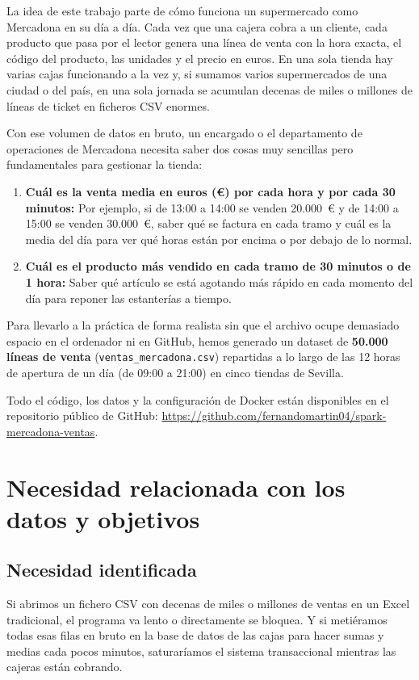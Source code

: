 \documentclass[a4paper,12pt]{article}
\newcommand{\RepoURL}{https://github.com/fernandomartin04/spark-mercadona-ventas}
\begin{document}
La idea de este trabajo parte de cómo funciona un supermercado como Mercadona en su día a día. Cada vez que una cajera cobra a un cliente, cada producto que pasa por el lector genera una línea de venta con la hora exacta, el código del producto, las unidades y el precio en euros. En una sola tienda hay varias cajas funcionando a la vez y, si sumamos varios supermercados de una ciudad o del país, en una sola jornada se acumulan decenas de miles o millones de líneas de ticket en ficheros CSV enormes.

Con ese volumen de datos en bruto, un encargado o el departamento de operaciones de Mercadona necesita saber dos cosas muy sencillas pero fundamentales para gestionar la tienda:
\begin{enumerate}[leftmargin=1.0cm]
    \item \textbf{Cuál es la venta media en euros (\euro{}) por cada hora y por cada 30 minutos:} Por ejemplo, si de 13:00 a 14:00 se venden 20.000~\euro{} y de 14:00 a 15:00 se venden 30.000~\euro{}, saber qué se factura en cada tramo y cuál es la media del día para ver qué horas están por encima o por debajo de lo normal.
    \item \textbf{Cuál es el producto más vendido en cada tramo de 30 minutos o de 1 hora:} Saber qué artículo se está agotando más rápido en cada momento del día para reponer las estanterías a tiempo.
\end{enumerate}

Para llevarlo a la práctica de forma realista sin que el archivo ocupe demasiado espacio en el ordenador ni en GitHub, hemos generado un dataset de \textbf{50.000 líneas de venta} (\texttt{ventas\_mercadona.csv}) repartidas a lo largo de las 12 horas de apertura de un día (de 09:00 a 21:00) en cinco tiendas de Sevilla.

Todo el código, los datos y la configuración de Docker están disponibles en el repositorio público de GitHub: \url{\RepoURL}.

\section{Necesidad relacionada con los datos y objetivos}

\subsection{Necesidad identificada}
Si abrimos un fichero CSV con decenas de miles o millones de ventas en un Excel tradicional, el programa va lento o directamente se bloquea. Y si metiéramos todas esas filas en bruto en la base de datos de las cajas para hacer sumas y medias cada pocos minutos, saturaríamos el sistema transaccional mientras las cajeras están cobrando.
\end{document}
